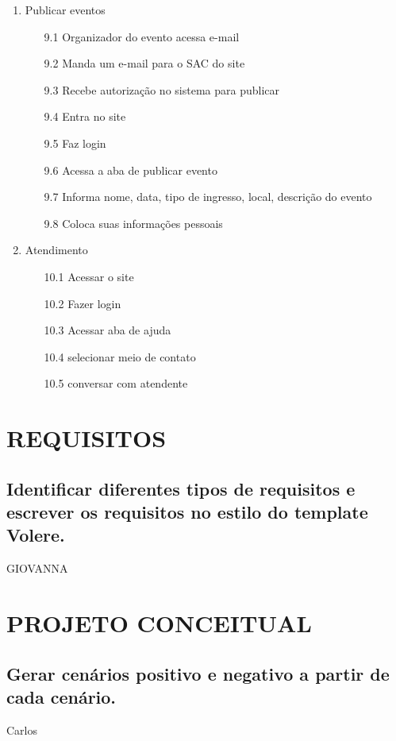 \documentclass[12pt]{article}
\begin{document}
\begin{enumerate}
            \item Publicar eventos
                \begin{enumerate}
                    \item[9.1] Organizador do evento acessa e-mail
                    \item[9.2] Manda um e-mail para o SAC do site
                    \item[9.3] Recebe autorização no sistema para publicar
                    \item[9.4] Entra no site
                    \item[9.5] Faz login
                    \item[9.6] Acessa a aba de publicar evento
                    \item[9.7] Informa nome, data, tipo de ingresso, local, descrição do evento
                    \item[9.8] Coloca suas informações pessoais
                \end{enumerate}
            
            \item Atendimento
                \begin{enumerate}
                    \item[10.1] Acessar o site
                    \item[10.2] Fazer login
                    \item[10.3] Acessar aba de ajuda
                    \item[10.4] selecionar meio de contato
                    \item[10.5] conversar com atendente
                \end{enumerate}
        \end{enumerate}
        
    \section{REQUISITOS}
        \subsection{Identificar diferentes tipos de requisitos e escrever os requisitos no estilo do template Volere.}
            GIOVANNA
    \section{PROJETO CONCEITUAL}
        \subsection{Gerar cenários positivo e negativo a partir de cada cenário.}
            Carlos
     
\end{document}
